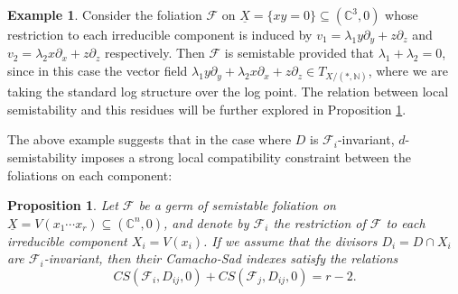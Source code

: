 \documentclass[reqno]{amsart}
\newcommand\C{\mathbb{C}}
\newcommand\N{\mathbb{N}}
\newcommand{\F}{\mathscr{F}}
\newtheorem{proposition}[theorem]{Proposition}
\theoremstyle{definition}
\newtheorem{example}[theorem]{Example}
\theoremstyle{named}
\begin{document}
\begin{example} \label{ex:babycamachosad} Consider the foliation $\F$ on $\underline{X}=\{xy=0\}\subseteq (\C^3,0)$ whose restriction to each irreducible component is induced by $v_1=\lambda_1y\partial_y+z\partial_z$ and $v_2=\lambda_2x\partial_x+z\partial_z$ respectively. Then $\F$ is semistable provided that $\lambda_1+\lambda_2=0$, since in this case the vector field $\lambda_1y\partial_y+\lambda_2 x\partial_x+z\partial_z\in T_{X/(\ast,\N)}$, where we are taking the standard log structure over the log point. The relation between local semistability and this residues will be further explored in Proposition \ref{prop:camacho-sad}.
\end{example}

The above example suggests that in the case where $D$ is $\F_i$-invariant, $d$-semistability imposes a strong local compatibility constraint between the foliations on each component:

\begin{proposition} \label{prop:camacho-sad}
Let $\F$ be a germ of semistable foliation on $\underline{X} = V(x_1\cdots x_r)\subseteq (\C^n,0)$, and denote by $\F_i$ the restriction of $\F$ to each irreducible component $X_i = V(x_i)$. If we assume that the divisors $D_i = D\cap X_i$ are $\F_i$-invariant, then their Camacho-Sad indexes satisfy the relations$$CS(\F_i,D_{ij},0) + CS(\F_j,D_{ij},0) = r-2.$$
\end{proposition}
\end{document}
